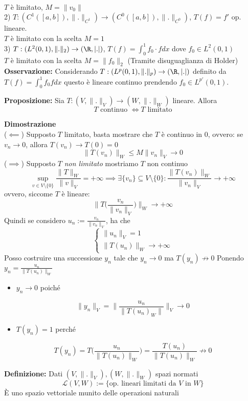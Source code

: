 \\$T$ è limitato, $M=\|v_0\|$ 
\\2) $T:(C^1([a,b]),\|.\|_{C^1})\to (C^0([a,b]),\|.\|_{C^0})$, $T(f)=f'$ op. lineare.
\\$T$ è limitato con la scelta $M=1$
\\3) $T:(L^{2}(0,1),\|.\|_2)\to (\R,|.|)$, $T(f)=\int_{0}^{1} f_0\cdot fdx $ dove $f_0\in L^{2}(0,1)$ 
\\$T$ è limitato con la scelta $M=\|f_0\|_2$ (Tramite disuguaglianza di Holder)
\\\textbf{Osservazione:} Considerando $T:(L^{p}(0,1),\|.\|_p)\to (\R,|.|)$ definito da $T(f)=\int_{0}^{1} f_0fdx $ questo è lineare continuo prendendo $f_0\in L^{p'}(0,1)$.
\\\divider
\begin{tcolorbox}
	\textbf{Proposizione: }Sia $T:(V,\|.\|_V)\to (W,\|.\|_W)$ lineare. Allora
	\[T\text{ continuo }\iff T \text{ limitato}\]
\end{tcolorbox}
\textbf{Dimostrazione} 
\\($\impliedby$) Supposto $T$ limitato, basta mostrare che $T$ è continuo in $0$, ovvero: se $v_n\to 0$, allora $T(v_n)\to T(0)=0$ 
\[\|T(v_n)\|_W\le M \|v_n\|_V\to 0\]
($\implies$) Supposto $T$ \emph{non limitato} mostriamo $T$ non continuo
\[\sup_{v\in V\setminus \{0\} }\frac{\|T\|_W}{\|v\|_V}=+\infty\implies \exists \{v_n\} \subseteq  V\setminus \{0\} :\frac{\|T(v_n)\|_W}{\|v_n\|_V}\to +\infty\]
ovvero, siccome $T$ è lineare:
\[\bigg\|T\bigg(\frac{v_n}{\|v_n\|_V}\bigg)\bigg\|_W\to +\infty\]
Quindi se considero $u_n:= \frac{v_n}{\|v_n\|_V}$, ha che 
\[\begin{cases}
	\|u_n\|_V=1\\
	\|T(u_n)\|_W\to +\infty
\end{cases}\]
Posso costruire una successione $y_n$ tale che $y_n\to 0$ ma $T(y_n)\not \to 0$
Ponendo $y_n= \frac{u_n}{\|T(u_n)\|_W}$
\begin{itemize}
	\item $y_n\to 0$ poiché 
\end{itemize}
\[\|y_n\|_V=\bigg\|\frac{u_n}{\|T(u_n)_W\|}\bigg\|_V\to 0\]
\begin{itemize}
	\item $T(y_n)=1$ perché
\end{itemize}
\[T(y_n)=T\bigg( \frac{u_n}{\|T(u_n)\|_W} \bigg)= \frac{T(u_n)}{\|T(u_n)\|_W}\not\to 0\]
\begin{tcolorbox}
	\textbf{Definizione: }Dati $(V,\|.\|_V),(W,\|.\|_W)$ spazi normati
	\[\mathcal L(V,W):=\{\text{op. lineari limitati da } V \text{ in }W\}\] 
	È uno spazio vettoriale munito delle operazioni naturali
\end{tcolorbox}

